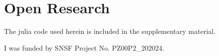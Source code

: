 \documentclass[draft]{agujournal2019}
\begin{document}
  \section*{Open Research}
  \noindent
  The julia code used herein is included in the supplementary material.



\acknowledgments
I was funded by SNSF Project No. PZ00P2\_202024.



% 
% 


\end{document}
